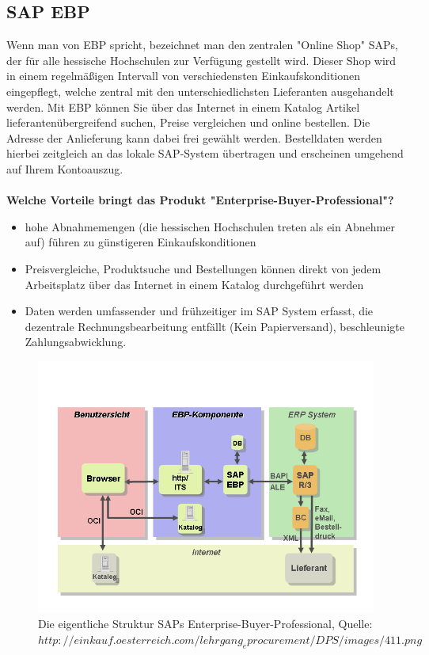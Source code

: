\documentclass[11pt,a4paper]{article}
\begin{document}
\newpage
\subsection{SAP EBP}

Wenn man von EBP spricht, bezeichnet man den zentralen "Online Shop" SAPs, der für alle hessische Hochschulen zur Verfügung gestellt wird. Dieser Shop wird in einem regelmäßigen Intervall von verschiedensten Einkaufskonditionen eingepflegt, welche zentral mit den unterschiedlichsten Lieferanten ausgehandelt werden. Mit EBP können Sie über das Internet in einem Katalog Artikel lieferantenübergreifend suchen, Preise vergleichen und online bestellen. Die Adresse der Anlieferung kann dabei frei gewählt werden. Bestelldaten werden hierbei zeitgleich an das lokale SAP-System übertragen und erscheinen umgehend auf Ihrem Kontoauszug. \\ \\

\noindent\textbf{Welche Vorteile bringt das Produkt "Enterprise-Buyer-Professional"?}

\begin{itemize}
	\item hohe Abnahmemengen (die hessischen Hochschulen treten als ein Abnehmer auf) führen zu günstigeren Einkaufskonditionen
	\item Preisvergleiche, Produktsuche und Bestellungen können direkt von jedem Arbeitsplatz über das Internet in einem Katalog durchgeführt werden
	\item Daten werden umfassender und frühzeitiger im SAP System erfasst, die dezentrale Rechnungsbearbeitung entfällt (Kein Papierversand), beschleunigte Zahlungsabwicklung.
\end{itemize}

\begin{figure}[ht!]
	\centering
	\includegraphics[width=150mm]{ebp}
	\caption{Die eigentliche Struktur SAPs Enterprise-Buyer-Professional, Quelle: $http://einkauf.oesterreich.com/lehrgang_eprocurement/DPS/images/411.png$ \label{ebp}}
\end{figure}
\end{document}
